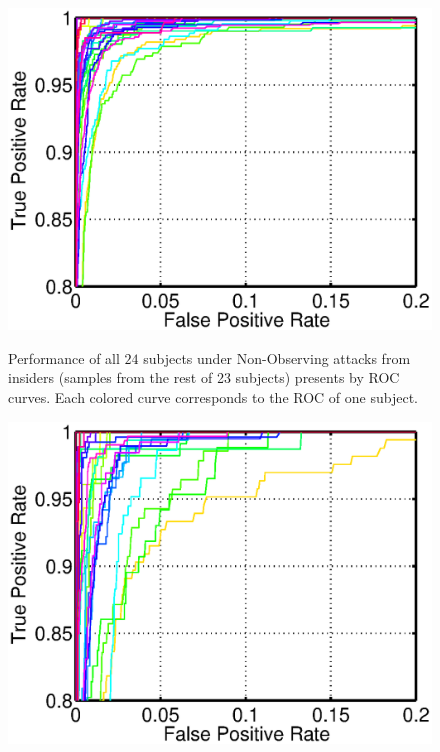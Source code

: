 \begin{figure}[!b]
\centering
\vspace{-6mm}
{\includegraphics[width=.8\columnwidth]{./Graphic/roc/fig_11_24random.eps}}
\vspace{-3mm}
\caption{Performance of all $24$ subjects under Non-Observing attacks from insiders (samples from the rest of 23 subjects) presents by ROC curves. Each colored curve corresponds to the ROC of one subject.}
\label{fig:random}
\end{figure}


\begin{figure}[!b]
\centering
\vspace{-6mm}
{\includegraphics[width=.8\columnwidth]{./Graphic/roc/fig_12_24randomImpostor.eps}} \\
\vspace{-3mm}
\caption{}
\label{fig:randomAliens}
\end{figure}

